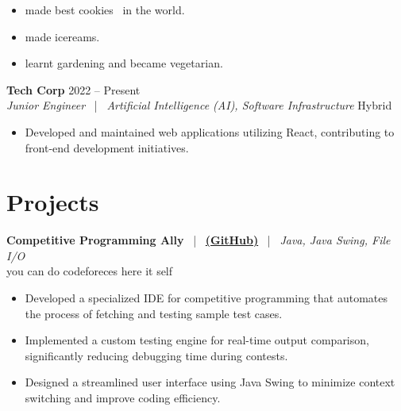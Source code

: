 \begin{itemize}[label=\textasteriskcentered, leftmargin=1.5em]

    \item made best cookies  in the world.

    \item made icereams.

    \item learnt gardening and became vegetarian.

\end{itemize}
%

\vspace{4pt}
%
%
\textbf{Tech Corp} \hfill 2022 -- Present \\
\textit{Junior Engineer} \ | \ \textit{Artificial Intelligence (AI), Software Infrastructure}%
%
 \hfill Hybrid%
%

\begin{itemize}[label=\textasteriskcentered, leftmargin=1.5em]

    \item Developed and maintained web applications utilizing React, contributing to front-end development initiatives.

\end{itemize}
%
%
%



%
\section{Projects}
%
\textbf{Competitive Programming Ally} \ | \ \href{https://github.com/0xPolybit/cp-ally-ide}{\textbf{(GitHub)}} \ | \ \textit{Java, Java Swing, File I/O}%
%
\\ you can do codeforeces here it self%
%

\begin{itemize}[label=\textasteriskcentered, leftmargin=1.5em]

    \item Developed a specialized IDE for competitive programming that automates the process of fetching and testing sample test cases.

    \item Implemented a custom testing engine for real-time output comparison, significantly reducing debugging time during contests.

    \item Designed a streamlined user interface using Java Swing to minimize context switching and improve coding efficiency.

\end{itemize}
%
%
%



